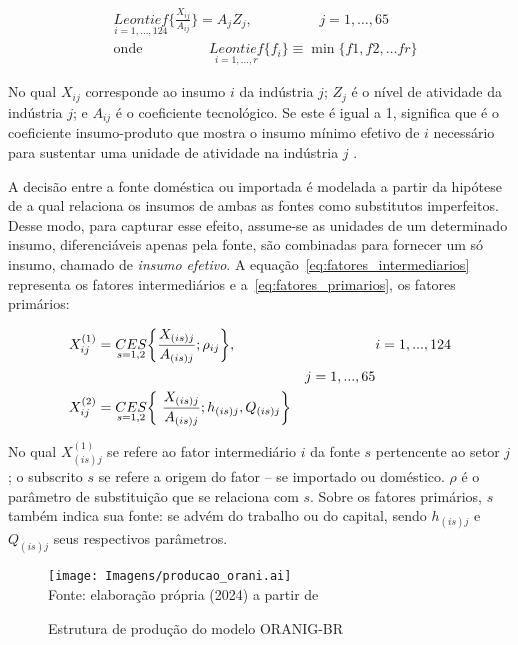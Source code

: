 \begin{align}
	&\underset{i = 1, ... , 124}{Leontief} \biggl\{ \frac{X_{ij}}{A_{ij}} \biggr\} = A_jZ_j, \hspace{2cm} j = 1, \dots , 65 \label{eq:leontief} \\
	&\text{onde} \hspace{2cm} \underset{i = 1, ... , r}{Leontief} \{f_i\} \equiv \min \{ f1, f2, \dots fr \}
\end{align}

No qual $X_{ij}$ corresponde ao insumo $i$ da indústria $j$; $Z_j$ é o nível de atividade da indústria $j$; e $A_{ij}$ é o coeficiente tecnológico. Se este é igual a 1, significa que é o coeficiente insumo-produto que mostra o insumo mínimo efetivo de $i$ necessário para sustentar uma unidade de atividade na indústria $j$ \cite{dixit80}.

A decisão entre a fonte doméstica ou importada é modelada a partir da hipótese de \textcite{armington69} a qual relaciona os insumos de ambas as fontes como substitutos imperfeitos. Desse modo, para capturar esse efeito, assume-se as unidades de um determinado insumo, diferenciáveis apenas pela fonte, são combinadas para fornecer um só insumo, chamado de \textit{insumo efetivo}. A equação~\eqref{eq:fatores_intermediarios} representa os fatores intermediários e a~\eqref{eq:fatores_primarios}, os fatores primários:

\begin{align}
	&X_{ij}^{(1)} = \underset{s = 1, 2}{CES} \biggl\{ \frac{X_{(is)j}}{A_{(is)j}}; \rho_{ij} \biggr\}, \label{eq:fatores_intermediarios} &&i = 1, ... , 124 \\ &&j = 1, ... , 65 \notag \\
	&X_{ij}^{(2)} = \underset{s = 1, 2}{CES} \biggl\{ \ \frac{X_{(is)j}}{A_{(is)j}}; h_{(is)j}, Q_{(is)j} \biggr\}&& \label{eq:fatores_primarios}
\end{align}

No qual $X_{(is)j}^{(1)}$ se refere ao fator intermediário $i$ da fonte $s$ pertencente ao setor $j$; o subscrito $s$ se refere a origem do fator -- se importado ou doméstico. $\rho$ é o parâmetro de substituição que se relaciona com $s$. Sobre os fatores primários, $s$ também indica sua fonte: se advém do trabalho ou do capital, sendo $h_{(is)j}$ e $Q_{(is)j}$ seus respectivos parâmetros.

\begin{landscape}
	\begin{figure}
		\centering
		\caption{Estrutura de produção do modelo ORANIG-BR} \label{fig:estrutura_producao}
		\texttt{[image: Imagens/producao\_orani.ai]}
		\footnotesize \\
		Fonte: elaboração própria (2024) a partir de \textcite{horridge00}
	\end{figure}
\end{landscape}

